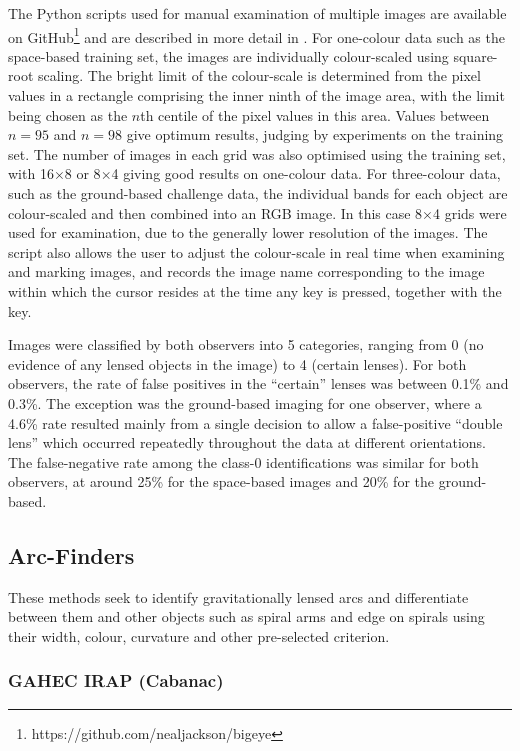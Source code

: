 \documentclass{aa}
\begin{document}
The Python scripts used for manual examination of multiple images are available
on GitHub\footnote{https://github.com/nealjackson/bigeye} and are described in more detail
in \citet{hartley2017support}. For one-colour data such as
the space-based training set, the images are individually colour-scaled using
square-root scaling. The bright limit of the colour-scale is determined
from the pixel values in a rectangle comprising the inner ninth of the
image area, with the limit being chosen as the $n$th centile of the pixel
values in this area. Values between $n=95$ and $n=98$ give optimum results,
judging by experiments on the training set. The number of images in each
grid was also optimised using the training set, with 16$\times$8 or 
8$\times$4 giving good results on one-colour data. For three-colour data,
such as the ground-based challenge data, the individual bands for each 
object are colour-scaled and then combined into an RGB image. In this case
8$\times$4 grids were used for examination, due to the generally lower 
resolution of the images. The script also allows the user to adjust the
colour-scale in real time when examining and marking images, and records
the image name corresponding to the image within which the cursor resides
at the time any key is pressed, together with the key.

Images were classified by both observers into 5 categories, ranging from
0 (no evidence of any lensed objects in the image) to 4 (certain lenses).
For both observers, the rate of false positives in the ``certain'' lenses
was between 0.1\% and 0.3\%. The exception was the ground-based imaging 
for one observer, where a 4.6\% rate resulted mainly from a
single decision to allow a false-positive ``double lens'' which occurred
repeatedly throughout the data at different orientations. The false-negative
rate among the class-0 identifications was similar for both observers, at
around 25\% for the space-based images and 20\% for the ground-based.

\subsection{Arc-Finders}

These methods seek to identify gravitationally lensed arcs and differentiate between them and 
other objects such as spiral arms and edge on spirals using their width, colour, curvature and other pre-selected criterion.

\subsubsection{ GAHEC IRAP (Cabanac)}
\label{sec:IRAP}
\end{document}
